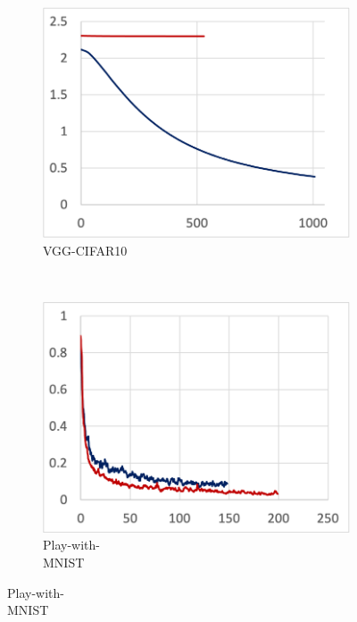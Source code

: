 \begin{figure}[!ht]
\begin{subfigure}[t]{.22\textwidth}
    \includegraphics[width=\textwidth]{keras-cifar}
    \caption{\small VGG-CIFAR10}
  \end{subfigure}
  ~
  \begin{subfigure}[t]{.22\textwidth}
    \includegraphics[width=\textwidth]{tf2-03}
    \caption{\small Play-with-\\MNIST}
  \end{subfigure}

  \par\bigskip
  

\end{figure}
